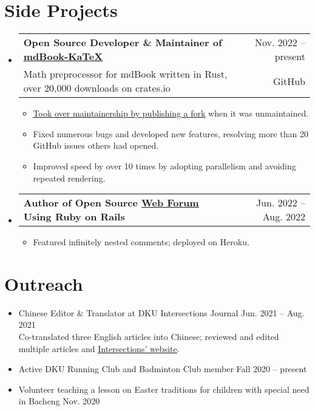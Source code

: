 \documentclass[letterpaper,11pt]{article}
\makeatletter
\newcommand{\CVItem}[1]{
  \item{\small
    {#1 \vspace{-2pt}}
  }
}
\newcommand{\CVSubheadingFrame}[1]{
  \vspace{-2pt}\item
    \begin{tabular*}{0.97\textwidth}[t]{l@{\extracolsep{\fill}}r}
        #1
    \end{tabular*}\vspace{-7pt}
}
\newcommand{\CVSubheading}[4]{\CVSubheadingFrame
    {\textbf{#1} & #2 \\
        \small#3 & #4 \\
    }}
\newcommand{\CVSubHeadingListStart}{\begin{itemize}[leftmargin=0.5cm, label={}]}
\newcommand{\CVSubHeadingListEnd}{\end{itemize}}
\newcommand{\CVItemListStart}{\begin{itemize}}
\newcommand{\CVItemListEnd}{\end{itemize}\vspace{-5pt}}
\newcommand{\uhref}[2]{\href{#1}{\underline{#2}}}
\makeatother
\begin{document}
\section{Side Projects}
\CVSubHeadingListStart
\CVSubheading
{Open Source Developer \& Maintainer of
    \uhref{https://github.com/lzanini/mdbook-katex}{mdBook-KaTeX}
}{Nov. 2022 -- present}
{Math preprocessor for mdBook written in Rust,
    over 20,000 downloads on crates.io
}{GitHub}
\CVItemListStart
\CVItem
{\uhref{https://github.com/lzanini/mdbook-katex/issues/37}
    {Took over maintainership by publishing a fork} when
    it was unmaintained.
}
\CVItem
{Fixed numerous bugs and developed new features,
    resolving more than 20 GitHub issues others had opened.
}
\CVItem
{Improved speed by over 10 times by adopting parallelism and
    avoiding repeated rendering.
}
\CVItemListEnd

\CVSubheadingFrame
{\textbf{Author of Open Source \uhref{https://github.com/SichangHe/rails_forum}
    {Web Forum} Using Ruby on Rails}&
    Jun. 2022 -- Aug. 2022
}
\CVItemListStart
\CVItem
{Featured infinitely nested comments;
    deployed on Heroku.
}
\CVItemListEnd
\CVSubHeadingListEnd

\section{Outreach}
\begin{itemize}
\item Chinese Editor \& Translator at DKU Intersections Journal\hfill
    Jun. 2021 -- Aug. 2021\\{\small
        Co-translated three English articles into Chinese;
        reviewed and edited multiple articles and
        \uhref{https://sites.duke.edu/intersections/}{Intersections' website}.
    }
    \vspace{-4pt}
\item Active DKU Running Club and Badminton Club member\hfill
    Fall 2020 -- present
    \vspace{-4pt}
\item Volunteer teaching a lesson on Easter traditions for children with
    special need in Bacheng\hfill
    Nov. 2020
    \vspace{-4pt}
\end{itemize}
\end{document}
